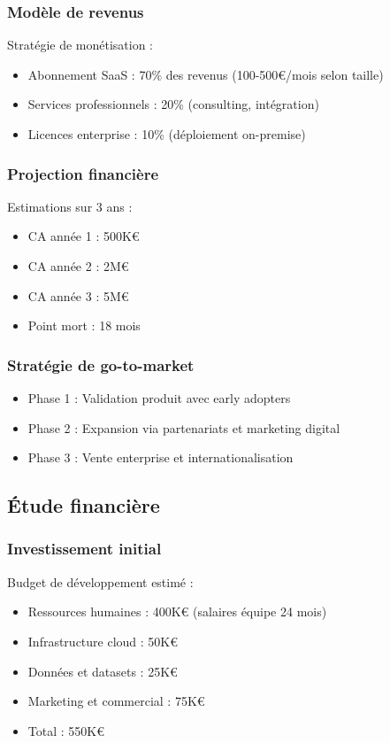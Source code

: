 \documentclass[12pt,a4paper]{report}
\begin{document}
\subsubsection{Modèle de revenus}

Stratégie de monétisation :
\begin{itemize}
\item Abonnement SaaS : 70\% des revenus (100-500€/mois selon taille)
\item Services professionnels : 20\% (consulting, intégration)
\item Licences enterprise : 10\% (déploiement on-premise)
\end{itemize}

\subsubsection{Projection financière}

Estimations sur 3 ans :
\begin{itemize}
\item CA année 1 : 500K€
\item CA année 2 : 2M€
\item CA année 3 : 5M€
\item Point mort : 18 mois
\end{itemize}

\subsubsection{Stratégie de go-to-market}

\begin{itemize}
\item Phase 1 : Validation produit avec early adopters
\item Phase 2 : Expansion via partenariats et marketing digital
\item Phase 3 : Vente enterprise et internationalisation
\end{itemize}

\subsection{Étude financière}

\subsubsection{Investissement initial}

Budget de développement estimé :
\begin{itemize}
\item Ressources humaines : 400K€ (salaires équipe 24 mois)
\item Infrastructure cloud : 50K€
\item Données et datasets : 25K€
\item Marketing et commercial : 75K€
\item Total : 550K€
\end{itemize}
\end{document}
